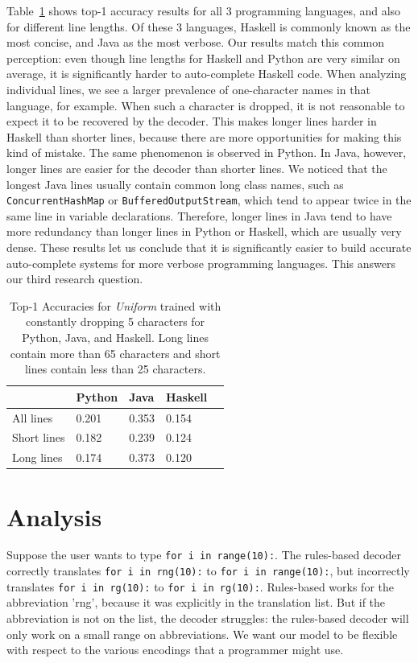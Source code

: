 \documentclass{article}
\begin{document}
Table~\ref{tab:top1acclangs} shows top-1 accuracy results
for all 3 programming languages, and also for different
line lengths. Of these 3 languages, Haskell is commonly
known as the most concise, and Java as the most verbose.
Our results match this common perception: even though
line lengths for Haskell and Python are very similar
on average, it is significantly harder to auto-complete
Haskell code. When analyzing individual lines, we see
a larger prevalence of one-character names in that language,
for example. When such a character is dropped, it is
not reasonable to expect it to be recovered by the decoder.
This makes longer lines harder in Haskell than shorter
lines, because there are more opportunities for making
this kind of mistake. The same phenomenon is observed
in Python. In Java, however, longer lines are easier
for the decoder than shorter lines. We noticed that
the longest Java lines usually contain common long
class names, such as \texttt{ConcurrentHashMap}
or \texttt{BufferedOutputStream}, which tend to appear
twice in the same line in variable declarations.
Therefore, longer lines in Java tend to have more
redundancy than longer lines in Python or Haskell,
which are usually very dense. These results let us
conclude that it is significantly easier to build accurate auto-complete systems for more verbose programming languages.
This answers our third research question.

\begin{table}
\centering
\begin{tabular}{|l|l|l|l|l|}
\hline
            & Python & Java  & Haskell \\ \hline
All lines   & 0.201  & 0.353 & 0.154   \\ \hline
Short lines & 0.182  & 0.239 & 0.124   \\ \hline
Long lines  & 0.174  & 0.373 & 0.120   \\ \hline
\end{tabular}
\bigskip
\caption{Top-1 Accuracies for \emph{Uniform} trained with constantly dropping 5 characters for Python, Java, and Haskell. Long lines contain more than 65 characters and short lines contain less than 25 characters.}
\label{tab:top1acclangs}
\end{table}

\section{Analysis}
Suppose the user wants to type \texttt{for i in range(10):}. The rules-based decoder correctly translates \texttt{for i in rng(10):} to \texttt{for i in range(10):}, but incorrectly translates \texttt{for i in rg(10):} to \texttt{for i in rg(10):}.
Rules-based works for the abbreviation 'rng', because it was explicitly in the translation list. But if the abbreviation is not on the list, the decoder struggles: the rules-based decoder will only work on a small range on abbreviations. We want our model to be flexible with respect to the various encodings that a programmer might use.
\end{document}
